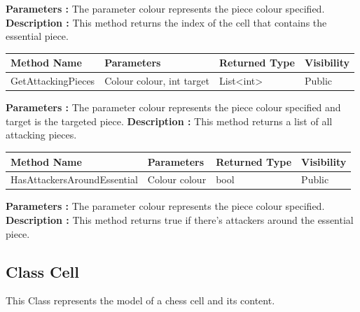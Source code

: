 \documentclass[12pt]{article}
\begin{document}
\textbf{Parameters :} The parameter colour represents the piece colour specified.
\textbf{Description :} This method returns the index of the cell that contains the essential piece.

\begin{table}[H]
    \begin{tabular}{|l|l|l|l|}
    \hline
    \rowcolor[HTML]{EFEFEF} 
    \cellcolor[HTML]{EFEFEF}\textbf{Method Name} & \textbf{Parameters}        & \textbf{Returned Type} & \textbf{Visibility} \\ \hline
    GetAttackingPieces                           & Colour colour, int target  & List\textless{}int\textgreater{}                   & Public              \\ \hline
    \end{tabular}
\end{table}

\textbf{Parameters :} The parameter colour represents the piece colour specified and target is the targeted piece.
\textbf{Description :} This method returns a list of all attacking pieces.

\begin{table}[H]
    \begin{tabular}{|l|l|l|l|}
    \hline
    \rowcolor[HTML]{EFEFEF} 
    \cellcolor[HTML]{EFEFEF}\textbf{Method Name} & \textbf{Parameters}     & \textbf{Returned Type} & \textbf{Visibility} \\ \hline
    HasAttackersAroundEssential                  & Colour colour           & bool                   & Public              \\ \hline
    \end{tabular}
\end{table}

\textbf{Parameters :} The parameter colour represents the piece colour specified.
\textbf{Description :} This method returns true if there's attackers around the essential piece.

\newpage


\subsection{Class Cell}

This Class represents the model of a chess cell and its content.
\end{document}
